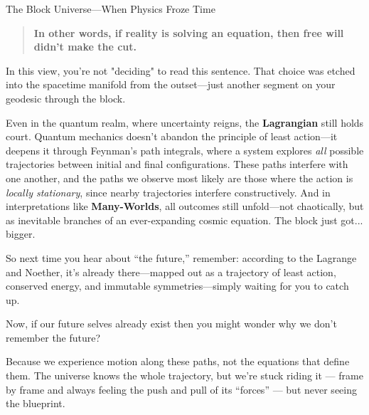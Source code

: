 \begin{HistoricalSidebar}{The Block Universe—When Physics Froze Time}
    \medskip
    
    \begin{quote}
    \textbf{In other words, if reality is solving an equation, then free will didn’t make the cut.}
    \end{quote}

    \medskip
    
    In this view, you’re not "deciding" to read this sentence. That choice was etched into the spacetime manifold from the outset—just another segment on your geodesic through the block.
    
    \medskip
    
    Even in the quantum realm, where uncertainty reigns, the \textbf{Lagrangian} still holds court. Quantum mechanics doesn’t abandon the principle of least action—it deepens it through Feynman’s path integrals, where a system explores \emph{all} possible trajectories between initial and final configurations. These paths interfere with one another, and the paths we observe most likely are those where the action is \emph{locally stationary}, since nearby trajectories interfere constructively. And in interpretations like \textbf{Many-Worlds}, all outcomes still unfold—not chaotically, but as inevitable branches of an ever-expanding cosmic equation. The block just got... bigger.


    \medskip
    
    So next time you hear about ``the future,'' remember: according to the Lagrange and Noether, it’s already there—mapped out as a trajectory of least action, conserved energy, and immutable symmetries—simply waiting for you to catch up.

    \medskip

    Now, if our future selves already exist then you might wonder why we don’t remember the future?

    \medskip

    Because we experience motion along these paths, not the equations that define them. The universe knows the whole trajectory, but we’re stuck riding it --- frame by frame and always feeling the push and pull of its ``forces'' --- but never seeing the blueprint.
    
\end{HistoricalSidebar}

